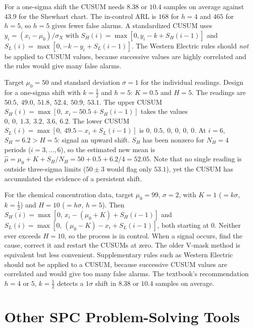 For a one-sigma shift the CUSUM needs $8.38$ or $10.4$ samples on average against $43.9$ for the Shewhart chart. The in-control ARL is $168$ for $h=4$ and $465$ for $h=5$, so $h=5$ gives fewer false alarms. A standardized CUSUM uses $y_i=(x_i-\mu_0)/\sigma_X$ with $S_H(i)=\max[0,y_i-k+S_H(i-1)]$ and $S_L(i)=\max[0,-k-y_i+S_L(i-1)]$. The Western Electric rules should \emph{not} be applied to CUSUM values, because successive values are highly correlated and the rules would give many false alarms.

\begin{example}\label{ex:cusum}
Target $\mu_0=50$ and standard deviation $\sigma=1$ for the individual readings. Design for a one-sigma shift with $k=\tfrac12$ and $h=5$: $K=0.5$ and $H=5$. The readings are $50.5,\ 49.0,\ 51.8,\ 52.4,\ 50.9,\ 53.1$. The upper CUSUM $S_H(i)=\max[0,\ x_i-50.5+S_H(i-1)]$ takes the values $0,\ 0,\ 1.3,\ 3.2,\ 3.6,\ 6.2$. The lower CUSUM $S_L(i)=\max[0,\ 49.5-x_i+S_L(i-1)]$ is $0,\ 0.5,\ 0,\ 0,\ 0,\ 0$. At $i=6$, $S_H=6.2>H=5$: signal an upward shift. $S_H$ has been nonzero for $N_H=4$ periods ($i=3,\dots,6$), so the estimated new mean is $\hat\mu=\mu_0+K+S_H/N_H=50+0.5+6.2/4=52.05$. Note that no single reading is outside three-sigma limits ($50\pm3$ would flag only $53.1$), yet the CUSUM has accumulated the evidence of a persistent shift.
\end{example}

\begin{example}
For the chemical concentration data, target $\mu_0=99$, $\sigma=2$, with $K=1$ ($=k\sigma$, $k=\tfrac12$) and $H=10$ ($=h\sigma$, $h=5$). Then $S_H(i)=\max[0,\,x_i-(\mu_0+K)+S_H(i-1)]$ and $S_L(i)=\max[0,\,(\mu_0-K)-x_i+S_L(i-1)]$, both starting at $0$. Neither ever exceeds $H=10$, so the process is in control. When a signal occurs, find the cause, correct it and restart the CUSUMs at zero. The older V-mask method is equivalent but less convenient. Supplementary rules such as Western Electric should not be applied to a CUSUM, because successive CUSUM values are correlated and would give too many false alarms. The textbook's recommendation $h=4$ or $5$, $k=\tfrac12$ detects a $1\sigma$ shift in $8.38$ or $10.4$ samples on average.
\end{example}

\section{Other SPC Problem-Solving Tools}

